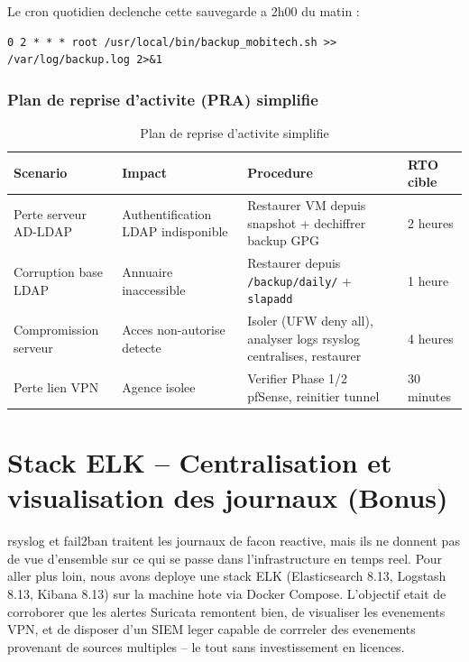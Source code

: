\documentclass[11pt,a4paper]{article}
\begin{document}
Le cron quotidien declenche cette sauvegarde a 2h00 du matin :

\begin{lstlisting}[caption={/etc/cron.d/mobitech-backup}]
0 2 * * * root /usr/local/bin/backup_mobitech.sh >> /var/log/backup.log 2>&1
\end{lstlisting}

\subsubsection{Plan de reprise d'activite (PRA) simplifie}

\begin{table}[H]
\centering
\begin{tabular}{@{}p{3cm}p{4cm}p{3.5cm}p{3.5cm}@{}}
\toprule
\textbf{Scenario} & \textbf{Impact} & \textbf{Procedure} & \textbf{RTO cible} \\
\midrule
Perte serveur AD-LDAP & Authentification LDAP indisponible & Restaurer VM depuis snapshot + dechiffrer backup GPG & 2 heures \\
Corruption base LDAP & Annuaire inaccessible & Restaurer depuis \texttt{/backup/daily/} + \texttt{slapadd} & 1 heure \\
Compromission serveur & Acces non-autorise detecte & Isoler (UFW deny all), analyser logs rsyslog centralises, restaurer & 4 heures \\
Perte lien VPN & Agence isolee & Verifier Phase 1/2 pfSense, reinitier tunnel & 30 minutes \\
\bottomrule
\end{tabular}
\caption{Plan de reprise d'activite simplifie}
\label{tab:pra}
\end{table}

\section{Stack ELK -- Centralisation et visualisation des journaux (Bonus)}
\label{sec:elk}

rsyslog et fail2ban traitent les journaux de facon reactive, mais ils ne donnent pas de vue d'ensemble sur ce qui se passe dans l'infrastructure en temps reel. Pour aller plus loin, nous avons deploye une stack ELK (Elasticsearch 8.13, Logstash 8.13, Kibana 8.13) sur la machine hote via Docker Compose. L'objectif etait de corroborer que les alertes Suricata remontent bien, de visualiser les evenements VPN, et de disposer d'un SIEM leger capable de corrreler des evenements provenant de sources multiples -- le tout sans investissement en licences.
\end{document}
